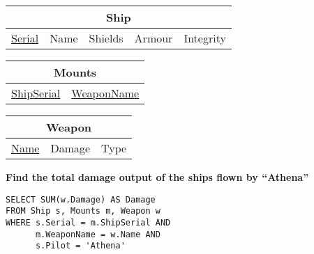 \documentclass{beamer}
\begin{document}
\begin{frame}[fragile]

\begin{tabular}{|c|c|c|c|c|}
\hline
\multicolumn{5}{|c|}{\textbf{Ship}} \\
\hline
\underline{Serial} & Name & Shields & Armour & Integrity \\
\hline
\end{tabular}

\begin{tabular}{|c|c|}
\hline
\multicolumn{2}{|c|}{\textbf{Mounts}} \\
\hline
\underline{ShipSerial} & \underline{WeaponName} \\
\hline
\end{tabular}

\begin{tabular}{|c|c|c|}
\hline
\multicolumn{3}{|c|}{\textbf{Weapon}} \\
\hline
\underline{Name} & Damage & Type \\
\hline
\end{tabular}

\vspace{0.25cm}
\textbf{Find the total damage output of the ships flown by ``Athena''}

\pause
\begin{lstlisting}[showstringspaces=false]
SELECT SUM(w.Damage) AS Damage
FROM Ship s, Mounts m, Weapon w
WHERE s.Serial = m.ShipSerial AND 
      m.WeaponName = w.Name AND
      s.Pilot = 'Athena'
\end{lstlisting}

\end{frame}
\end{document}
